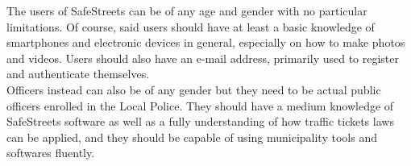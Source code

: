 The users of SafeStreets can be of any age and gender with no particular limitations. Of course, said users should have at least a basic knowledge of smartphones and electronic devices in general, especially on how to make photos and videos.
Users should also have an e-mail address, primarily used to register and authenticate themselves.\\
Officers instead can also be of any gender but they need to be actual public officers enrolled in the Local Police.
They should have a medium knowledge of SafeStreets software as well as a fully understanding of how traffic tickets laws can be applied, and they should be capable of using municipality tools and softwares fluently.